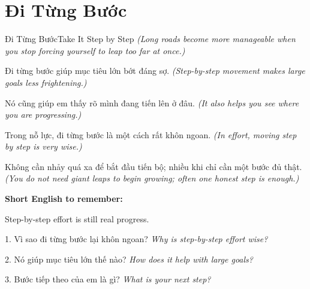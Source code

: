 \section{Đi Từng Bước}
\begin{truyen}{Đi Từng Bước}{Take It Step by Step}
\textit{(Long roads become more manageable when you stop forcing yourself to leap too far at once.)}

Đi từng bước giúp mục tiêu lớn bớt đáng sợ.
\textit{(Step-by-step movement makes large goals less frightening.)}

Nó cũng giúp em thấy rõ mình đang tiến lên ở đâu.
\textit{(It also helps you see where you are progressing.)}

Trong nỗ lực, đi từng bước là một cách rất khôn ngoan.
\textit{(In effort, moving step by step is very wise.)}
\end{truyen}

\begin{baihoc}
Không cần nhảy quá xa để bắt đầu tiến bộ; nhiều khi chỉ cần một bước đủ thật.
\textit{(You do not need giant leaps to begin growing; often one honest step is enough.)}
\end{baihoc}

\begin{ghinhoanh}
\textbf{Short English to remember:}

Step-by-step effort is still real progress.

\end{ghinhoanh}

\begin{tuhocnhanh}
1. Vì sao đi từng bước lại khôn ngoan? \textit{Why is step-by-step effort wise?}

2. Nó giúp mục tiêu lớn thế nào? \textit{How does it help with large goals?}

3. Bước tiếp theo của em là gì? \textit{What is your next step?}
\end{tuhocnhanh}
\ngancach